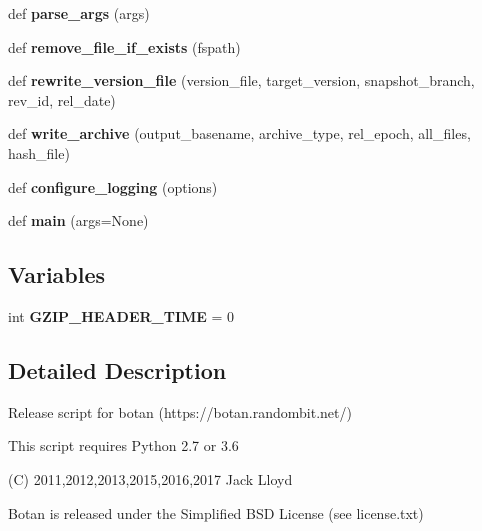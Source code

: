 \begin{DoxyCompactItemize}
def {\bfseries parse\+\_\+args} (args)
\item 
\mbox{\label{namespacedist_a4735de24b2212222604322ff44f7a456}} 
def {\bfseries remove\+\_\+file\+\_\+if\+\_\+exists} (fspath)
\item 
\mbox{\label{namespacedist_aad336472a020f445fdb862132b77d75b}} 
def {\bfseries rewrite\+\_\+version\+\_\+file} (version\+\_\+file, target\+\_\+version, snapshot\+\_\+branch, rev\+\_\+id, rel\+\_\+date)
\item 
\mbox{\label{namespacedist_a6094f85a3745324d7fbf1df2eac6cb70}} 
def {\bfseries write\+\_\+archive} (output\+\_\+basename, archive\+\_\+type, rel\+\_\+epoch, all\+\_\+files, hash\+\_\+file)
\item 
\mbox{\label{namespacedist_aa35147e7d9b2cc5867ff5d31f14e8bc9}} 
def {\bfseries configure\+\_\+logging} (options)
\item 
\mbox{\label{namespacedist_a0f6ddc78e8e39e4b595dff8cbd018554}} 
def {\bfseries main} (args=None)
\end{DoxyCompactItemize}
\subsection*{Variables}
\begin{DoxyCompactItemize}
\item 
\mbox{\label{namespacedist_a678177da8befd5186d86c96933214127}} 
int {\bfseries G\+Z\+I\+P\+\_\+\+H\+E\+A\+D\+E\+R\+\_\+\+T\+I\+ME} = 0
\end{DoxyCompactItemize}


\subsection{Detailed Description}
\begin{DoxyVerb}Release script for botan (https://botan.randombit.net/)

This script requires Python 2.7 or 3.6

(C) 2011,2012,2013,2015,2016,2017 Jack Lloyd

Botan is released under the Simplified BSD License (see license.txt)
\end{DoxyVerb}
 